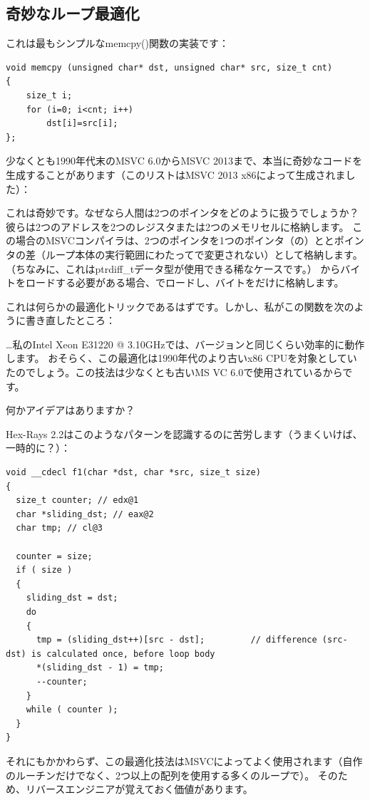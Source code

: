 \subsection{奇妙なループ最適化}

これは最もシンプルなmemcpy()関数の実装です：

\begin{lstlisting}[style=customc]
void memcpy (unsigned char* dst, unsigned char* src, size_t cnt)
{
	size_t i;
	for (i=0; i<cnt; i++)
		dst[i]=src[i];
};
\end{lstlisting}

少なくとも1990年代末のMSVC 6.0からMSVC 2013まで、本当に奇妙なコードを生成することがあります（このリストはMSVC 2013 x86によって生成されました）：



これは奇妙です。なぜなら人間は2つのポインタをどのように扱うでしょうか？彼らは2つのアドレスを2つのレジスタまたは2つのメモリセルに格納します。
この場合のMSVCコンパイラは、2つのポインタを1つのポインタ（\EAX{}の）ととポインタの差（ループ本体の実行範囲にわたって\ESI{}で変更されない）として格納します。
（ちなみに、これはptrdiff\_tデータ型が使用できる稀なケースです。）
からバイトをロードする必要がある場合、でロードし、バイトをだけに格納します。

これは何らかの最適化トリックであるはずです。しかし、私がこの関数を次のように書き直したところ：



\dots{}私のIntel Xeon E31220 @ 3.10GHzでは、バージョンと同じくらい効率的に動作します。
おそらく、この最適化は1990年代のより古いx86 CPUを対象としていたのでしょう。この技法は少なくとも古いMS VC 6.0で使用されているからです。

何かアイデアはありますか？

Hex-Rays 2.2はこのようなパターンを認識するのに苦労します（うまくいけば、一時的に？）：

\begin{lstlisting}[style=customc]
void __cdecl f1(char *dst, char *src, size_t size)
{
  size_t counter; // edx@1
  char *sliding_dst; // eax@2
  char tmp; // cl@3

  counter = size;
  if ( size )
  {
    sliding_dst = dst;
    do
    {
      tmp = (sliding_dst++)[src - dst];         // difference (src-dst) is calculated once, before loop body
      *(sliding_dst - 1) = tmp;
      --counter;
    }
    while ( counter );
  }
}
\end{lstlisting}

それにもかかわらず、この最適化技法はMSVCによってよく使用されます（自作のルーチンだけでなく、2つ以上の配列を使用する多くのループで）。
そのため、リバースエンジニアが覚えておく価値があります。

